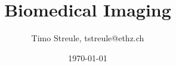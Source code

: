 \documentclass[%
,a3paper
,fontsize=10.5pt
,landscape
,pagesize
,headinclude
]{scrartcl}
\title{Biomedical Imaging}
\author{Timo Streule, tstreule@ethz.ch}
\date{\today}
\begin{document}
	

	\begin{multicols*}{4}


		\maketitle

		
		
		
		
		
		
		
		

	\end{multicols*}
\end{document}
